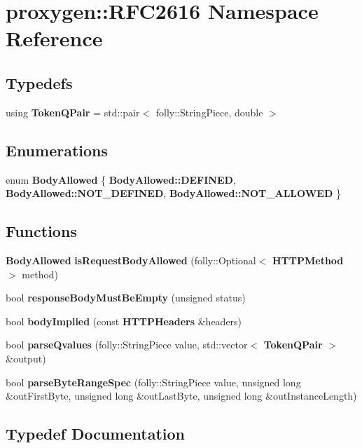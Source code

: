 \section{proxygen\+:\+:R\+F\+C2616 Namespace Reference}
\label{namespaceproxygen_1_1RFC2616}
\subsection*{Typedefs}
\begin{DoxyCompactItemize}
\item 
using {\bf Token\+Q\+Pair} = std\+::pair$<$ folly\+::\+String\+Piece, double $>$
\end{DoxyCompactItemize}
\subsection*{Enumerations}
\begin{DoxyCompactItemize}
\item 
enum {\bf Body\+Allowed} \{ {\bf Body\+Allowed\+::\+D\+E\+F\+I\+N\+ED}, 
{\bf Body\+Allowed\+::\+N\+O\+T\+\_\+\+D\+E\+F\+I\+N\+ED}, 
{\bf Body\+Allowed\+::\+N\+O\+T\+\_\+\+A\+L\+L\+O\+W\+ED}
 \}
\end{DoxyCompactItemize}
\subsection*{Functions}
\begin{DoxyCompactItemize}
\item 
{\bf Body\+Allowed} {\bf is\+Request\+Body\+Allowed} (folly\+::\+Optional$<$ {\bf H\+T\+T\+P\+Method} $>$ method)
\item 
bool {\bf response\+Body\+Must\+Be\+Empty} (unsigned status)
\item 
bool {\bf body\+Implied} (const {\bf H\+T\+T\+P\+Headers} \&headers)
\item 
bool {\bf parse\+Qvalues} (folly\+::\+String\+Piece value, std\+::vector$<$ {\bf Token\+Q\+Pair} $>$ \&output)
\item 
bool {\bf parse\+Byte\+Range\+Spec} (folly\+::\+String\+Piece value, unsigned long \&out\+First\+Byte, unsigned long \&out\+Last\+Byte, unsigned long \&out\+Instance\+Length)
\end{DoxyCompactItemize}


\subsection{Typedef Documentation}
